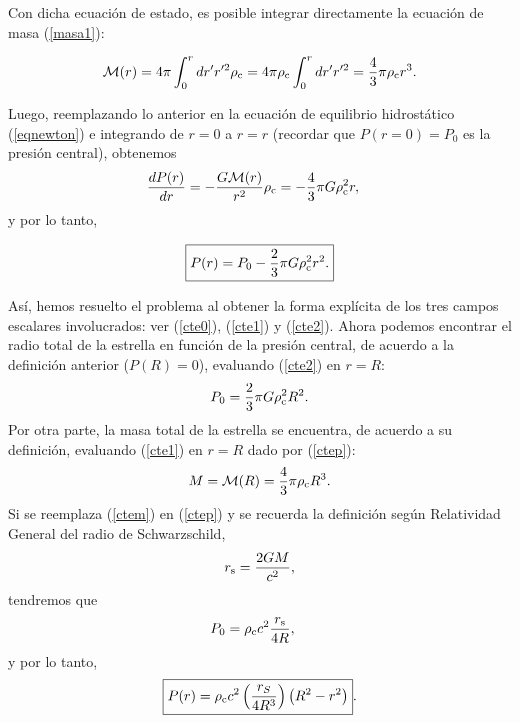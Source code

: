 Con dicha ecuación de estado, es posible integrar directamente la ecuación de masa (\ref{masa1}):

\begin{equation}\label{cte1}
\mathcal{M}(r)=4\pi\int^r_{0}dr'r'^2\rho_{\rm c}=4\pi\rho_{\rm c}\int^r_{0}dr'r'^2=\frac{4}{3}\pi\rho_{\rm c} r^3.
\end{equation}

Luego, reemplazando lo anterior en la ecuación de equilibrio hidrostático (\ref{eqnewton}) e integrando de $r=0$ a $r=r$ (recordar que $P(r=0)=P_0$ es la presión central), obtenemos
\begin{align*}
 \frac{dP(r)}{dr}&=-\frac{G\mathcal{M}(r)}{r^2}\rho_{\rm c}=-\frac{4}{3}\pi G\rho_{\rm c}^2 r,
\end{align*}
y por lo tanto,

\begin{equation}
\label{cte2}\boxed{P(r)=P_0-\frac{2}{3}\pi G\rho_{\rm c}^2 r^2.}
\end{equation}

Así, hemos resuelto el problema al obtener la forma explícita de los tres campos escalares involucrados: ver (\ref{cte0}), (\ref{cte1}) y (\ref{cte2}). Ahora podemos encontrar el radio total de la estrella en función de la presión central, de acuerdo a la definición anterior ($P(R)=0$), evaluando (\ref{cte2}) en $r=R$:
\begin{equation}\label{ctep}
 P_0=\frac{2}{3}\pi G\rho_{\rm c}^2 R^2.
\end{equation}
Por otra parte, la masa total de la estrella se encuentra, de acuerdo a su definición, evaluando (\ref{cte1}) en $r=R$ dado por (\ref{ctep}):
\begin{equation}\label{ctem}
 M=\mathcal{M}(R)=\frac{4}{3}\pi\rho_{\rm c} R^3.
\end{equation}
Si se reemplaza (\ref{ctem}) en (\ref{ctep}) y se recuerda la definición según Relatividad General del radio de Schwarzschild,
\begin{equation}\label{radiosch}
 r_{\rm s}=\frac{2GM}{c^2},
\end{equation}
tendremos que
\begin{align*}
P_0 &=\rho_{\rm c} c^2\frac{r_{\rm s}}{4R},
\end{align*}
y por lo tanto,
\begin{equation}\label{presionnewton}
 \boxed{P(r)=\rho_{\rm c} c^2\left(\frac{r_S}{4 R^3}\right)\left(R^2-r^2\right)}.
\end{equation}

